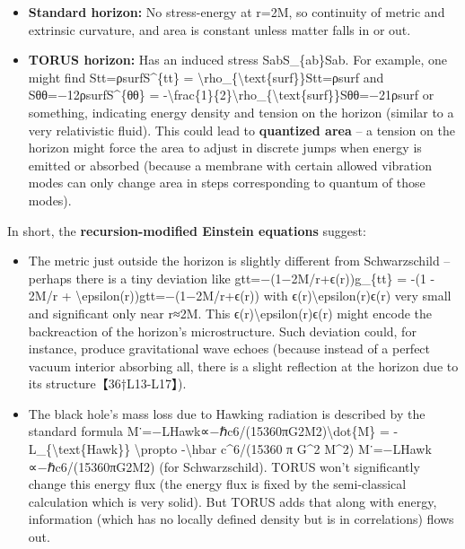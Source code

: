 \documentclass[]{article}
\begin{document}
\begin{itemize}
\item
  \textbf{Standard horizon:} No stress-energy at r=2M, so continuity of
  metric and extrinsic curvature, and area is constant unless matter
  falls in or out.
\item
  \textbf{TORUS horizon:} Has an induced stress SabS\_\{ab\}Sab​. For
  example, one might find Stt=ρsurfS\^{}\{tt\} =
  \textbackslash{}rho\_\{\textbackslash{}text\{surf\}\}Stt=ρsurf​ and
  Sθθ=−12ρsurfS\^{}\{θθ\} =
  -\textbackslash{}frac\{1\}\{2\}\textbackslash{}rho\_\{\textbackslash{}text\{surf\}\}Sθθ=−21​ρsurf​
  or something, indicating energy density and tension on the horizon
  (similar to a very relativistic fluid). This could lead to
  \textbf{quantized area} -- a tension on the horizon might force the
  area to adjust in discrete jumps when energy is emitted or absorbed
  (because a membrane with certain allowed vibration modes can only
  change area in steps corresponding to quantum of those modes).
\end{itemize}

In short, the \textbf{recursion-modified Einstein equations} suggest:

\begin{itemize}
\item
  The metric just outside the horizon is slightly different from
  Schwarzschild -- perhaps there is a tiny deviation like
  gtt=−(1−2M/r+ϵ(r))g\_\{tt\} = -(1 - 2M/r +
  \textbackslash{}epsilon(r))gtt​=−(1−2M/r+ϵ(r)) with
  ϵ(r)\textbackslash{}epsilon(r)ϵ(r) very small and significant only
  near r≈2M. This ϵ(r)\textbackslash{}epsilon(r)ϵ(r) might encode the
  backreaction of the horizon's microstructure. Such deviation could,
  for instance, produce gravitational wave echoes (because instead of a
  perfect vacuum interior absorbing all, there is a slight reflection at
  the horizon due to its structure【36†L13-L17】).
\item
  The black hole's mass loss due to Hawking radiation is described by
  the standard formula
  M˙=−LHawk∝−ℏc6/(15360πG2M2)\textbackslash{}dot\{M\} =
  -L\_\{\textbackslash{}text\{Hawk\}\} \textbackslash{}propto
  -\textbackslash{}hbar c\^{}6/(15360 π G\^{}2 M\^{}2)
  M˙=−LHawk​∝−ℏc6/(15360πG2M2) (for Schwarzschild). TORUS won't
  significantly change this energy flux (the energy flux is fixed by the
  semi-classical calculation which is very solid). But TORUS adds that
  along with energy, information (which has no locally defined density
  but is in correlations) flows out.
\end{itemize}
\end{document}
